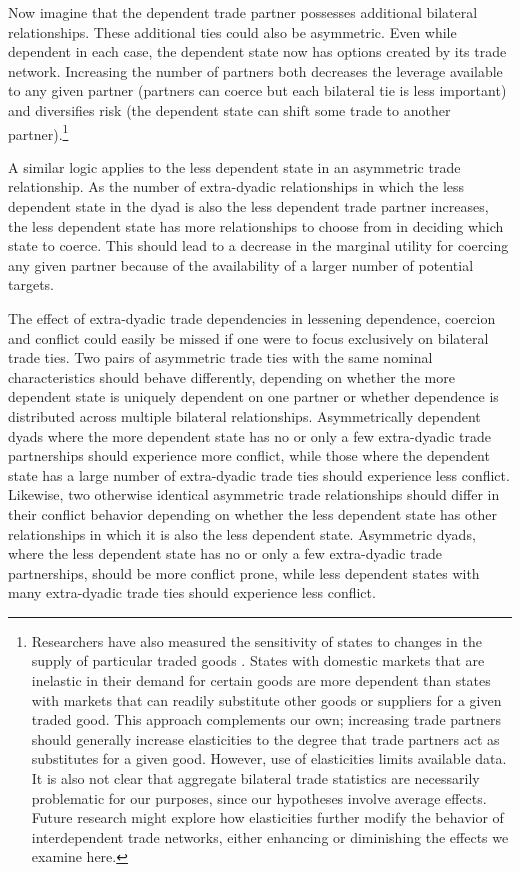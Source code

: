 \documentclass[12pt]{article}
\theoremstyle{hypothesis}
\begin{document}
Now imagine that the dependent trade partner possesses additional bilateral relationships.  These additional ties could also be asymmetric.  Even while dependent in each case, the dependent state now has options created by its trade network.  Increasing the number of partners both decreases the leverage available to any given partner (partners can coerce but each bilateral tie is less important) and diversifies risk (the dependent state can shift some trade to another partner).\footnote{Researchers have also measured the sensitivity of states to changes in the supply of particular traded goods \citep{Gasiorowski:1986,Polachek:1999,Crescenzi:2003}.  States with domestic markets that are inelastic in their demand for certain goods are more dependent than states with markets that can readily substitute other goods or suppliers for a given traded good.  This approach complements our own; increasing trade partners should generally increase elasticities to the degree that trade partners act as substitutes for a given good. However, use of elasticities limits available data.  It is also not clear that aggregate bilateral trade statistics are necessarily problematic for our purposes, since our hypotheses involve average effects.  Future research might explore how elasticities further modify the behavior of interdependent trade networks, either enhancing or diminishing the effects we examine here.}

A similar logic applies to the less dependent state in an asymmetric trade relationship. As the number of extra-dyadic relationships in which the less dependent state in the dyad is also the less dependent trade partner increases, the less dependent state has more relationships to choose from in deciding which state to coerce.  This should lead to a decrease in the marginal utility for coercing any given partner because of the availability of a larger number of potential targets.

The effect of extra-dyadic trade dependencies in lessening dependence, coercion and conflict could easily be missed if one were to focus exclusively on bilateral trade ties.  Two pairs of asymmetric trade ties with the same nominal characteristics should behave differently, depending on whether the more dependent state is uniquely dependent on one partner or whether dependence is distributed across multiple bilateral relationships. Asymmetrically dependent dyads where the more dependent state has no or only a few extra-dyadic trade partnerships should experience more conflict, while those where the dependent state has a large number of extra-dyadic trade ties should experience less conflict. Likewise, two otherwise identical asymmetric trade relationships should differ in their conflict behavior depending on whether the less dependent state has other relationships in which it is also the less dependent state. Asymmetric dyads, where the less dependent state has no or only a few extra-dyadic trade partnerships, should be more conflict prone, while less dependent states with many extra-dyadic trade ties should experience less conflict.
\end{document}
